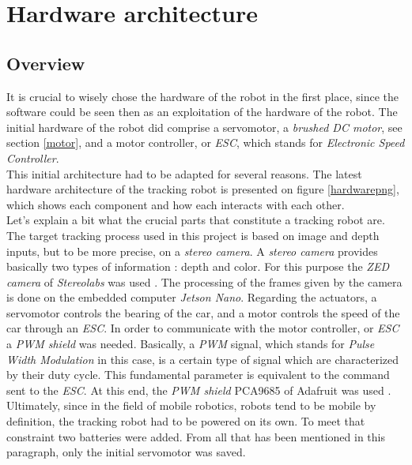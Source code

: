 	\section{Hardware architecture}
		
		\subsection{Overview}\label{hardwareoverview}
		
		It is crucial to wisely chose the hardware of the robot in the first place, since
		the software could be seen then as an exploitation of the hardware of 
		the robot. The initial hardware of the robot did comprise
		a servomotor, a \textit{brushed DC motor}, see section \vref{motor}, and a motor controller, or \textit{ESC}, which
		stands for \textit{ Electronic Speed Controller}.
		\\\indent This initial architecture had to be adapted for several reasons.
		The latest hardware architecture of the tracking robot is
		presented on figure \vref{hardwarepng}, which
		shows each component and how each interacts with each other.
		\\\indent Let's explain a bit what the crucial parts
		that constitute a tracking robot are. The target tracking process used
		in this project is based on image and depth inputs, but to be more
		precise, on a \textit{stereo camera}. A \textit{stereo camera}
		provides basically two types of information : depth and color.
		For this purpose the \textit{ZED camera} of \textit{Stereolabs}
		was used \cite{zeddoc}. The processing of the frames
		given by the camera is done on the embedded computer
		\textit{Jetson Nano}. Regarding the actuators, a servomotor
		controls the bearing of the car, and a motor controls the speed
		of the car through an \textit{ESC}. In order to communicate
		with the motor controller, or \textit{ESC} a \textit{PWM shield}
		was needed. Basically, a \textit{PWM} signal, which stands for
		\textit{Pulse Width Modulation} in this case, is a certain type
		of signal which are characterized by their duty cycle. This 
		fundamental parameter is equivalent to the command sent 
		to the \textit{ESC}. At this end, the \textit{PWM shield} PCA9685
		of Adafruit was used \cite{adafruitpwm}. Ultimately, since
		in the field of mobile robotics, robots tend to be mobile by definition,
		the tracking robot had to be powered on its own. To 
		meet that constraint two batteries were added. From all that has
		been mentioned in this paragraph, only the initial servomotor was
		saved.
		

